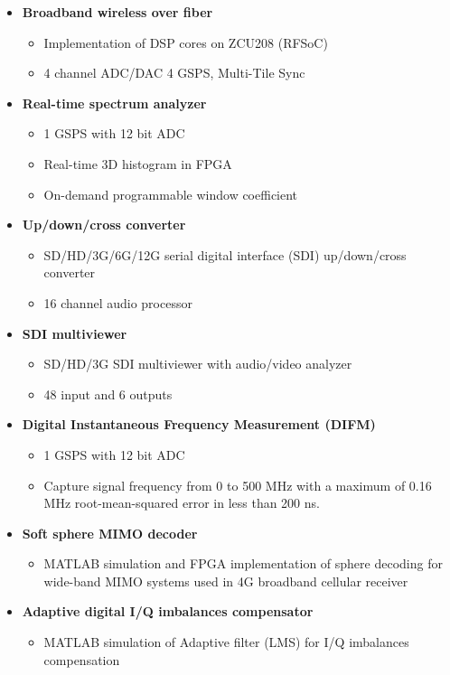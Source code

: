 
\begin{itemize}
	\item \textbf{Broadband wireless over fiber}
	      \begin{itemize}
		      \item Implementation of DSP cores on ZCU208 (RFSoC)
		      \item 4 channel ADC/DAC 4 GSPS, Multi-Tile Sync
	      \end{itemize}
	\item \textbf{Real-time spectrum analyzer}
	      \begin{itemize}
		      \item 1 GSPS with 12 bit ADC
		      \item Real-time 3D histogram in FPGA
		      \item On-demand programmable window coefficient
	      \end{itemize}
	\item \textbf{Up/down/cross converter}
	      \begin{itemize}
		      \item SD/HD/3G/6G/12G serial digital interface (SDI) up/down/cross converter
		      \item 16 channel audio processor
	      \end{itemize}
	\item \textbf{SDI multiviewer}
	      \begin{itemize}
		      \item SD/HD/3G SDI multiviewer with audio/video analyzer
		      \item 48 input and 6 outputs
	      \end{itemize}
	\item \textbf{Digital Instantaneous Frequency Measurement (DIFM)}
	      \begin{itemize}
		      \item 1 GSPS with 12 bit ADC
		      \item Capture signal frequency from 0 to 500 MHz with a maximum of 0.16 MHz
		            root-mean-squared error in less than 200 ns.
	      \end{itemize}
	\item \textbf{Soft sphere MIMO decoder}
	      \begin{itemize}
		      \item MATLAB simulation and FPGA implementation of sphere decoding for wide-band
		            MIMO systems used in 4G broadband cellular receiver
	      \end{itemize}
	\item \textbf{Adaptive digital I/Q imbalances compensator}
	      \begin{itemize}
		      \item MATLAB simulation of Adaptive filter (LMS) for I/Q imbalances compensation
	      \end{itemize}
\end{itemize}
